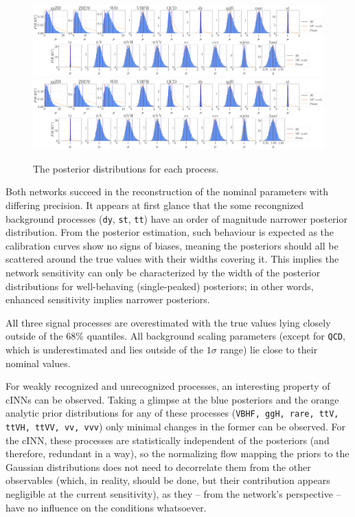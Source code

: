 \begin{figure}[h!]
	\centering
	\includegraphics[width=\linewidth]{figures/inference/finalNoSummarye11000_posteriors}
	\includegraphics[width=\linewidth]{figures/inference/finalSummary1Layer11000e300NodesCdim100_posteriors}
	\caption{The posterior distributions for each process.}
	\label{fig:posteriors}
\end{figure}

Both networks succeed in the reconstruction of the nominal parameters with differing precision. It appears at first glance that the some recongnized background processes (\texttt{dy}, \texttt{st}, \texttt{tt}) have an order of magnitude narrower posterior distribution. From the posterior estimation, such behaviour is expected as the calibration curves show no signs of biases, meaning the posteriors should all be scattered around the true values with their widths covering it. This implies the network sensitivity can only be characterized by the width of the posterior distributions for well-behaving (single-peaked) posteriors; in other words, enhanced sensitivity implies narrower posteriors.

All three signal processes are overestimated with the true values lying closely outside of the 68\% quantiles. All background scaling parameters (except for \texttt{QCD}, which is underestimated and lies outside of the $1\sigma$ range) lie close to their nominal values.

For weakly recognized and unrecognized processes, an interesting property of cINNs can be observed. Taking a glimpse at the blue posteriors and the orange analytic prior distributions for any of these processes (\texttt{VBHF, ggH, rare, ttV, ttVH, ttVV, vv, vvv}) only minimal changes in the former can be observed. For the cINN, these processes are statistically independent of the posteriors (and therefore, redundant in a way), so the normalizing flow mapping the priors to the Gaussian distributions does not need to decorrelate them from the other observables (which, in reality, should be done, but their contribution appears negligible at the current sensitivity), as they -- from the network's perspective -- have no influence on the conditions whatsoever.

